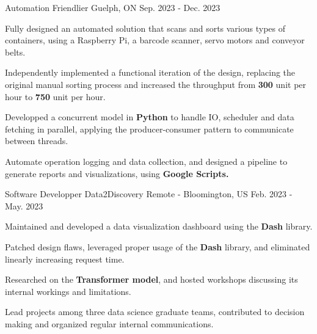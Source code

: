 

\begin{cventries}
\cventry
{Automation} %
{Friendlier} %
{Guelph, ON} %
{Sep. 2023 - Dec. 2023} %
{
  \begin{cvitems} %
    \item {Fully designed an automated solution that scans and sorts various types of containers, using a Raspberry Pi, a barcode scanner, servo motors and conveyor belts.}
    \item {Independently implemented a functional iteration of the design, replacing the original manual sorting process and increased the throughput from \textbf{300} unit per hour to \textbf{750} unit per hour.}
    \item {Developped a concurrent model in \textbf{Python} to handle IO, scheduler and data fetching in parallel, applying the producer-consumer pattern to communicate between threads.}
    \item {Automate operation logging and data collection, and designed a pipeline to generate reports and visualizations, using \textbf{Google Scripts.}}
  \end{cvitems}
}

  \cventry
    {Software Developper} %
    {Data2Discovery} %
    {Remote - Bloomington, US} %
    {Feb. 2023 - May. 2023} %
    {
      \begin{cvitems} %
        \item {Maintained and developed a data visualization dashboard using the \textbf{Dash} library.}
        \item {Patched design flaws, leveraged proper usage of the \textbf{Dash} library, and eliminated linearly increasing request time.}
        \item {Researched on the \textbf{Transformer model}, and hosted workshops discussing its internal workings and limitations.}
        \item {Lead projects among three data science graduate teams, contributed to decision making and organized regular internal communications.}
      \end{cvitems}
    }

\end{cventries}
